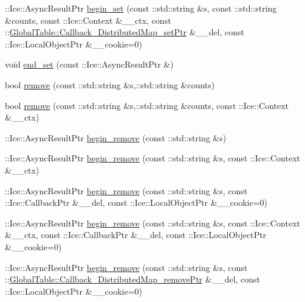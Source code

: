 \begin{DoxyCompactItemize}
\item 
::Ice::AsyncResultPtr \hyperlink{class_ice_proxy_1_1_global_table_1_1_distributed_map_a5df6c6297880fcc72e1bf22ed9e5c5d7}{begin\_\-set} (const ::std::string \&s, const ::std::string \&counts, const ::Ice::Context \&\_\-\_\-ctx, const ::\hyperlink{namespace_global_table_a8196b91ca3241e16fd9aac727da95e02}{GlobalTable::Callback\_\-DistributedMap\_\-setPtr} \&\_\-\_\-del, const ::Ice::LocalObjectPtr \&\_\-\_\-cookie=0)
\item 
void \hyperlink{class_ice_proxy_1_1_global_table_1_1_distributed_map_ae239c32c97bd02ee75aeef48aa70ae2c}{end\_\-set} (const ::Ice::AsyncResultPtr \&)
\item 
bool \hyperlink{class_ice_proxy_1_1_global_table_1_1_distributed_map_a8a88c46caccec89eb51ad36ca88f6e48}{remove} (const ::std::string \&s,::std::string \&counts)
\item 
bool \hyperlink{class_ice_proxy_1_1_global_table_1_1_distributed_map_a69aa492b23c94fceb48cddfba3b79918}{remove} (const ::std::string \&s,::std::string \&counts, const ::Ice::Context \&\_\-\_\-ctx)
\item 
::Ice::AsyncResultPtr \hyperlink{class_ice_proxy_1_1_global_table_1_1_distributed_map_ae2df6dc016871497c81bd0949a3ea037}{begin\_\-remove} (const ::std::string \&s)
\item 
::Ice::AsyncResultPtr \hyperlink{class_ice_proxy_1_1_global_table_1_1_distributed_map_ab4e20e4daba455d1ce906c7902a36920}{begin\_\-remove} (const ::std::string \&s, const ::Ice::Context \&\_\-\_\-ctx)
\item 
::Ice::AsyncResultPtr \hyperlink{class_ice_proxy_1_1_global_table_1_1_distributed_map_a02216812ca9a3cbfd3b21f93c70475b6}{begin\_\-remove} (const ::std::string \&s, const ::Ice::CallbackPtr \&\_\-\_\-del, const ::Ice::LocalObjectPtr \&\_\-\_\-cookie=0)
\item 
::Ice::AsyncResultPtr \hyperlink{class_ice_proxy_1_1_global_table_1_1_distributed_map_a479d4d5d16d3d2f83c24a848cb5757f2}{begin\_\-remove} (const ::std::string \&s, const ::Ice::Context \&\_\-\_\-ctx, const ::Ice::CallbackPtr \&\_\-\_\-del, const ::Ice::LocalObjectPtr \&\_\-\_\-cookie=0)
\item 
::Ice::AsyncResultPtr \hyperlink{class_ice_proxy_1_1_global_table_1_1_distributed_map_a73ca90ed2e6c33812eb9fa967da6caaf}{begin\_\-remove} (const ::std::string \&s, const ::\hyperlink{namespace_global_table_a38ad32022b6559c698996becbe357749}{GlobalTable::Callback\_\-DistributedMap\_\-removePtr} \&\_\-\_\-del, const ::Ice::LocalObjectPtr \&\_\-\_\-cookie=0)

\end{DoxyCompactItemize}
